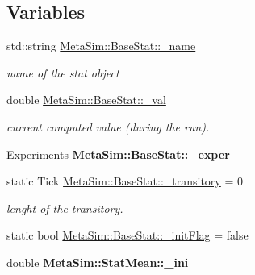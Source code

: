 \subsection*{Variables}
\begin{DoxyCompactItemize}
\item 
std\+::string \hyperlink{group__metasim__stat_gadc11fad00a3ef6ab589510c4ed514625}{Meta\+Sim\+::\+Base\+Stat\+::\+\_\+name}\hypertarget{group__metasim__stat_gadc11fad00a3ef6ab589510c4ed514625}{}\label{group__metasim__stat_gadc11fad00a3ef6ab589510c4ed514625}

\begin{DoxyCompactList}\small\item\em name of the stat object \end{DoxyCompactList}\item 
double \hyperlink{group__metasim__stat_ga64ad3d61015bd5b232df8ae12a5e9b8f}{Meta\+Sim\+::\+Base\+Stat\+::\+\_\+val}\hypertarget{group__metasim__stat_ga64ad3d61015bd5b232df8ae12a5e9b8f}{}\label{group__metasim__stat_ga64ad3d61015bd5b232df8ae12a5e9b8f}

\begin{DoxyCompactList}\small\item\em current computed value (during the run). \end{DoxyCompactList}\item 
Experiments {\bfseries Meta\+Sim\+::\+Base\+Stat\+::\+\_\+exper}\hypertarget{group__metasim__stat_ga1b3e491a16cf65ce9a5e93b8e23b3853}{}\label{group__metasim__stat_ga1b3e491a16cf65ce9a5e93b8e23b3853}

\item 
static Tick \hyperlink{group__metasim__stat_gabe2f955eab4756e73d411e41df17cf68}{Meta\+Sim\+::\+Base\+Stat\+::\+\_\+transitory} = 0\hypertarget{group__metasim__stat_gabe2f955eab4756e73d411e41df17cf68}{}\label{group__metasim__stat_gabe2f955eab4756e73d411e41df17cf68}

\begin{DoxyCompactList}\small\item\em lenght of the transitory. \end{DoxyCompactList}\item 
static bool \hyperlink{group__metasim__stat_gac2cec74a9d6f8990cfb06fcd32327b60}{Meta\+Sim\+::\+Base\+Stat\+::\+\_\+init\+Flag} = false
\item 
double {\bfseries Meta\+Sim\+::\+Stat\+Mean\+::\+\_\+ini}\hypertarget{group__metasim__stat_ga6edffbe8938e28d971c4e7f4026c33c3}{}\label{group__metasim__stat_ga6edffbe8938e28d971c4e7f4026c33c3}


\end{DoxyCompactItemize}
